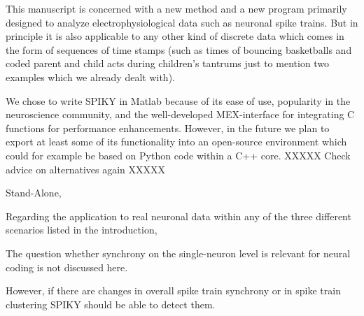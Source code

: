 \documentclass[10pt,twocolumn]{elsart5p}
\begin{document}
This manuscript is concerned with a new method and a new program primarily designed to analyze electrophysiological data such as neuronal spike trains. But in principle it is also applicable to any other kind of discrete data which comes in the form of sequences of time stamps (such as times of bouncing basketballs and coded parent and child acts during children's tantrums just to mention two examples which we already dealt with).

We chose to write SPIKY in Matlab because of its ease of use, popularity in the neuroscience community, and the well-developed MEX-interface for integrating C functions for performance enhancements. However, in the future we plan to export at least some of its functionality into an open-source environment which could for example be based on Python code within a C++ core. XXXXX Check advice on alternatives again XXXXX

Stand-Alone, 

Regarding the application to real neuronal data within any of the three different scenarios listed in the introduction,

The question whether synchrony on the single-neuron level is relevant for neural coding is not discussed here.

However, if there are changes in overall spike train synchrony or in spike train clustering SPIKY should be able to detect them.

%
%
\end{document}
